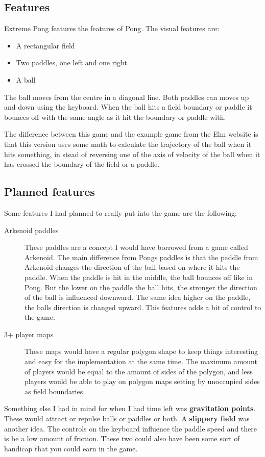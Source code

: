 \documentclass[a4paper]{article}
\begin{document}
\subsection{Features}
Extreme Pong features the features of Pong. The visual features are:
\begin{itemize}
\item A rectangular field
\item Two paddles, one left and one right
\item A ball
\end{itemize}
The ball moves from the centre in a diagonal line. Both paddles can moves up and
 down using the keyboard. When the ball hits a field boundary or paddle it
 bounces off with the same angle as it hit the boundary or paddle with. 

The difference between this game and the example game from the Elm website is
 that this version uses some math to calculate the trajectory of the ball when
 it hits something, in stead of reversing one of the axis of velocity of the
 ball when it has crossed the boundary of the field or a paddle. 

\subsection{Planned features}
Some features I had planned to really put into the game are the following:
\begin{description}
\item[Arkenoid paddles] These paddles are a concept I would have borrowed from a
 game called Arkenoid. The main difference from Pongs paddles is that the paddle
 from Arkenoid changes the direction of the ball based on where it hits the
 paddle. When the paddle is hit in the middle, the ball bounces off like in
 Pong. But the lower on the paddle the ball hits, the stronger the direction of
 the ball is influenced downward. The same idea higher on the paddle, the balls
 direction is changed upward. This features adds a bit of control to the game. 
\item[3+ player maps] These maps would have a regular polygon shape to keep
 things interesting and easy for the implementation at the same time. The
 maximum amount of players would be equal to the amount of sides of the polygon,
 and less players would be able to play on polygon maps setting by unoccupied
 sides as field boundaries. 
\end{description}
Something else I had in mind for when I had time left was \textbf{gravitation
 points}. These would attract or repulse balls or paddles or both. A
 \textbf{slippery field} was another idea. The controls on the keyboard
 influence the paddle speed and there is be a low amount of friction. These
 two could also have been some sort of handicap that you could earn in the game.
\end{document}
